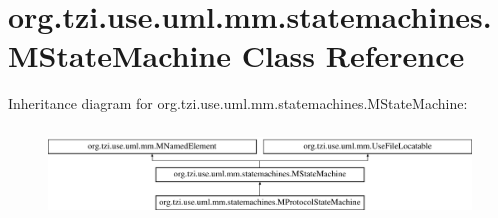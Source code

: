\hypertarget{classorg_1_1tzi_1_1use_1_1uml_1_1mm_1_1statemachines_1_1_m_state_machine}{\section{org.\-tzi.\-use.\-uml.\-mm.\-statemachines.\-M\-State\-Machine Class Reference}
\label{classorg_1_1tzi_1_1use_1_1uml_1_1mm_1_1statemachines_1_1_m_state_machine}
}
Inheritance diagram for org.\-tzi.\-use.\-uml.\-mm.\-statemachines.\-M\-State\-Machine\-:\begin{figure}[H]
\begin{center}
\leavevmode
\includegraphics[height=2.427746cm]{classorg_1_1tzi_1_1use_1_1uml_1_1mm_1_1statemachines_1_1_m_state_machine}
\end{center}
\end{figure}
